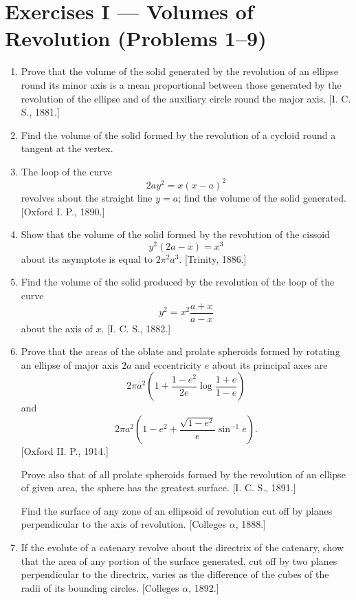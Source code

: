 \documentclass[11pt, a4paper]{article}
\newcommand{\source}[1]{\hfill\textnormal{[#1]}}
\begin{document}
\section*{Exercises I --- Volumes of Revolution (Problems 1--9)}

\begin{enumerate}[leftmargin=2em]

\item Prove that the volume of the solid generated by the revolution of an ellipse round its minor axis is a mean proportional between those generated by the revolution of the ellipse and of the auxiliary circle round the major axis.
\source{I. C. S., 1881.}

\item Find the volume of the solid formed by the revolution of a cycloid round a tangent at the vertex.

\item The loop of the curve
\[
2ay^2=x(x-a)^2
\]
revolves about the straight line $y=a$; find the volume of the solid generated.
\source{Oxford I. P., 1890.}

\item Show that the volume of the solid formed by the revolution of the cissoid
\[
y^2(2a-x)=x^3
\]
about its asymptote is equal to $2\pi^2a^3$.
\source{Trinity, 1886.}

\item Find the volume of the solid produced by the revolution of the loop of the curve
\[
y^2=x^2\frac{a+x}{a-x}
\]
about the axis of $x$.
\source{I. C. S., 1882.}

\item Prove that the areas of the oblate and prolate spheroids formed by rotating an ellipse of major axis $2a$ and eccentricity $e$ about its principal axes are
\[
2\pi a^2\left(1+\frac{1-e^2}{2e}\log\frac{1+e}{1-e}\right)
\]
and
\[
2\pi a^2\left(1-e^2+\frac{\sqrt{1-e^2}}{e}\sin^{-1}e\right).
\]
\source{Oxford II. P., 1914.}

Prove also that of all prolate spheroids formed by the revolution of an ellipse of given area, the sphere has the greatest surface.
\source{I. C. S., 1891.}

Find the surface of any zone of an ellipsoid of revolution cut off by planes perpendicular to the axis of revolution.
\source{Colleges $\alpha$, 1888.}

\item If the evolute of a catenary revolve about the directrix of the catenary, show that the area of any portion of the surface generated, cut off by two planes perpendicular to the directrix, varies as the difference of the cubes of the radii of its bounding circles.
\source{Colleges $\alpha$, 1892.}


\end{enumerate}
\end{document}

